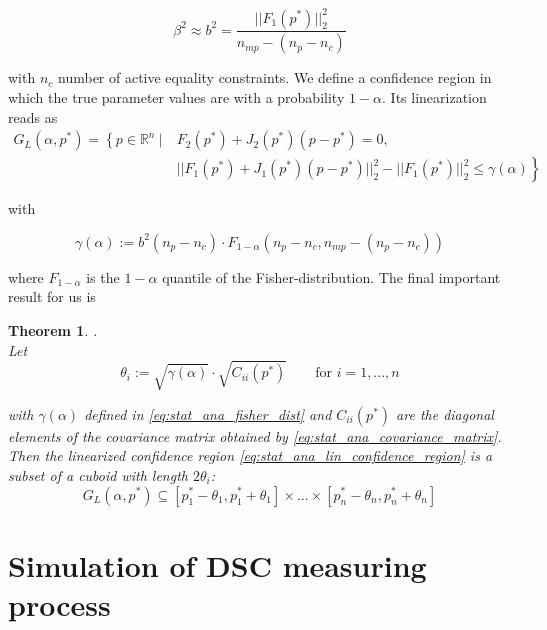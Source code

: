 \documentclass{scrartcl}[12pt, halfparskip]
\numberwithin{equation}{section}
\numberwithin{figure}{section}
\numberwithin{table}{section}
\newtheorem{Theorem}{Theorem}
\begin{document}
\begin{equation}
	\beta^2 \approx b^2 = \frac{|| F_1(p^*) ||_2^2}{n_{mp} - (n_p - n_c)}
\end{equation}

with $n_c$ number of active equality constraints. We define a confidence region in which the true parameter values are with a probability $1-\alpha$. Its linearization reads as
\begin{align}
	G_L(\alpha, p^*) = \left\{ p \in \mathbb{R}^n \ | \ \right. & F_2(p^*) + J_2(p^*)(p - p^*) = 0, \label{eq:stat_ana_lin_confidence_region} \\ 
	& \left. || F_1(p^*) + J_1(p^*)(p - p^*) ||_2^2 - || F_1(p^*)||_2^2 \le \gamma(\alpha) \right\} \nonumber	
\end{align}

with 

\begin{equation}
	\gamma(\alpha) := b^2 (n_p - n_c) \cdot F_{1-\alpha}(n_p - n_c, n_{mp} - (n_p - n_c))
	\label{eq:stat_ana_fisher_dist}
\end{equation}

where $F_{1-\alpha}$ is the $1-\alpha$ quantile of the Fisher-distribution. The final important result for us is

\begin{Theorem} .\\
	Let 
	\begin{equation}
		\theta_i := \sqrt{\gamma(\alpha)} \cdot \sqrt{C_{ii}(p^*)} \qquad \text{for } i=1,...,n
	\end{equation}
	
	with $\gamma(\alpha)$ defined in \cref{eq:stat_ana_fisher_dist} and $C_{ii}(p^*)$ are the diagonal elements of the covariance matrix obtained by \cref{eq:stat_ana_covariance_matrix}. Then the linearized confidence region \cref{eq:stat_ana_lin_confidence_region} is a subset of a cuboid with length $2 \theta_i$:
	\begin{equation}
		G_L(\alpha, p^*) \subseteq [p_1^* - \theta_1, p_1^* + \theta_1] \times ... \times [p_n^* - \theta_n, p_n^* + \theta_n]
	\end{equation}
	
\end{Theorem}



\newpage
\section{Simulation of DSC measuring process}
\end{document}
